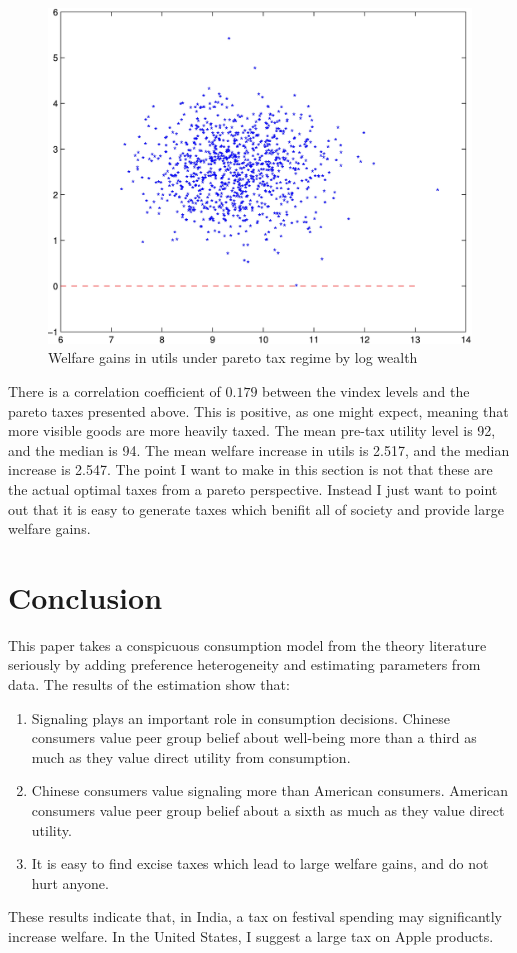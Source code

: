 \documentclass[12pt]{article}
\begin{document}
\begin{figure}
    \centering 
	\includegraphics[scale=.8]{pics/taxscat_cropped.jpg}
    \caption{Welfare gains in utils under pareto tax regime by log wealth}
    \label{fig:taxscatter}
\end{figure}
There is a correlation coefficient of $0.179$ between the vindex levels and the pareto taxes presented above.  This is positive, as one might expect, meaning that more visible goods are more heavily taxed.
The mean pre-tax utility level is 92, and the median is 94.  The mean welfare increase in utils is 2.517, and the median increase is 2.547.  The point I want to make in this section is not that these are the actual optimal taxes from a pareto perspective.  Instead I just want to point out that it is easy to generate taxes which benifit all of society and provide large welfare gains.

\section{Conclusion}
This paper takes a conspicuous consumption model from the theory literature seriously by adding preference heterogeneity and estimating parameters from data.
The results of the estimation show that:
\begin{enumerate}
    \item Signaling plays an important role in consumption decisions.  Chinese consumers value peer group belief about well-being more than a third as much as they value direct utility from consumption.
    \item Chinese consumers value signaling more than American consumers.  American consumers value peer group belief about a sixth as much as they value direct utility.
    \item It is easy to find excise taxes which lead to large welfare gains, and do not hurt anyone.
\end{enumerate}
	These results indicate that, in India, a tax on festival spending may significantly increase welfare.
In the United States, I suggest a large tax on Apple products.
\end{document}
